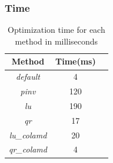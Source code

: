 \documentclass[12pt, a4paper]{article}
\begin{document}
\subsubsection{Time}
\begin{table}[H]
  \centering
  \begin{tabular}{|c|c|c|}
  \hline
  \textbf{Method} & \textbf{Time(ms)}\\
  \hline
  \textit{default} & 4\\\hline
  \textit{pinv} & 120\\\hline
  \textit{lu} & 190\\\hline
  \textit{qr} & 17\\\hline
  \textit{lu\_colamd} & 20\\\hline
  \textit{qr\_colamd} & 4\\\hline
  \hline
  \end{tabular}
  \caption{Optimization time for each method in milliseconds}
  \end{table}
\end{document}
